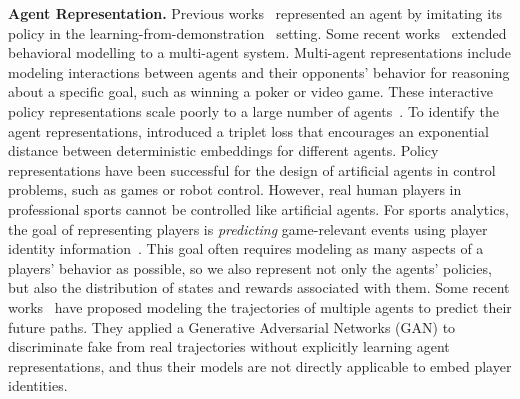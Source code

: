 \documentclass{article}
\begin{document}
{\bf Agent Representation.}
Previous works~\cite{guenter2007reinforcement,KoberP08policy,Kormushev13RLRobotics} represented an agent by imitating its policy in the learning-from-demonstration~\cite{Argall09lfd} setting.  Some recent works~\cite{AlbrechtSurvey18,GroverRepresent18,RubinPoker11,BakkesHehavior12} extended  behavioral modelling to a multi-agent system. Multi-agent representations include modeling interactions between agents and their opponents' behavior for reasoning about a specific goal, such as winning a poker or video game. These interactive policy representations scale poorly to a large number of agents~\cite{AlbrechtSurvey18,AlbrechtR16}.
To identify the agent representations, \cite{GroverRepresent18} introduced a triplet loss that encourages an exponential distance between deterministic embeddings for different agents.
Policy representations have been successful for the design of artificial agents in control problems, such as games or robot control. However, 
real human players in professional sports cannot be controlled like artificial agents. For sports analytics,
the goal of representing players is {\em predicting} game-relevant events using player identity information~\cite{ganguly2018problem,schwartz}. This goal often requires modeling as many aspects of a players' behavior as possible, so we also represent 
not only the agents' policies, but also 
the distribution of states and rewards associated with them.
Some recent works~\cite{Sadeghian2019SoPhie,Gupta18SocialGan} have proposed modeling the trajectories of multiple agents to predict their future paths. They applied a Generative Adversarial Networks (GAN) to discriminate fake from real trajectories without explicitly learning agent representations, and thus their models are not directly applicable to embed  player identities.
\end{document}
